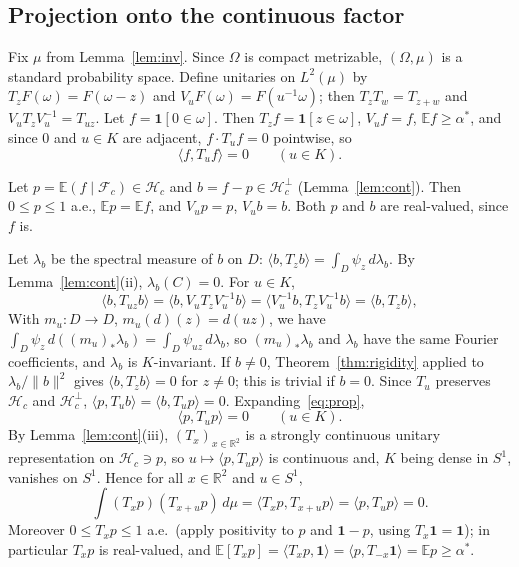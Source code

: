 \documentclass[11pt]{amsart}
\theoremstyle{definition}
\theoremstyle{remark}
\newcommand{\R}{\mathbb{R}}
\newcommand{\E}{\mathbb{E}}
\newcommand{\Hc}{\mathcal{H}_c}
\newcommand{\Fc}{\mathcal{F}_c}
\newcommand{\one}{\mathbf 1}
\begin{document}
\subsection{Projection onto the continuous factor}
Fix $\mu$ from Lemma~\ref{lem:inv}. Since $\Omega$ is compact metrizable, $(\Omega,\mu)$ is a standard probability space. Define unitaries on $L^2(\mu)$ by $T_zF(\omega)=F(\omega-z)$ and $V_uF(\omega)=F(u^{-1}\omega)$; then $T_zT_w=T_{z+w}$ and $V_uT_zV_u^{-1}=T_{uz}$. Let $f=\one[0\in\omega]$. Then $T_zf=\one[z\in\omega]$, $V_uf=f$, $\E f\ge\alpha^*$, and since $0$ and $u\in K$ are adjacent, $f\cdot T_uf=0$ pointwise, so
\begin{equation}\label{eq:prop}
  \langle f,T_uf\rangle=0\qquad(u\in K).
\end{equation}

Let $p=\E(f\mid\Fc)\in\Hc$ and $b=f-p\in\Hc^\perp$ (Lemma~\ref{lem:cont}). Then $0\le p\le1$ a.e., $\E p=\E f$, and $V_up=p$, $V_ub=b$. Both $p$ and $b$ are real-valued, since $f$ is.

Let $\lambda_b$ be the spectral measure of $b$ on $D$: $\langle b,T_zb\rangle=\int_D\psi_z\,d\lambda_b$. By Lemma~\ref{lem:cont}(ii), $\lambda_b(C)=0$. For $u\in K$,
\[
  \langle b,T_{uz}b\rangle=\langle b,V_uT_zV_u^{-1}b\rangle=\langle V_u^{-1}b,T_zV_u^{-1}b\rangle=\langle b,T_zb\rangle,
\]
With $m_u:D\to D$, $m_u(d)(z)=d(uz)$, we have $\int_D\psi_z\,d((m_u)_*\lambda_b)=\int_D\psi_{uz}\,d\lambda_b$, so $(m_u)_*\lambda_b$ and $\lambda_b$ have the same Fourier coefficients, and $\lambda_b$ is $K$-invariant. If $b\ne0$, Theorem~\ref{thm:rigidity} applied to $\lambda_b/\|b\|^2$ gives $\langle b,T_zb\rangle=0$ for $z\ne0$; this is trivial if $b=0$. Since $T_u$ preserves $\Hc$ and $\Hc^\perp$, $\langle p,T_ub\rangle=\langle b,T_up\rangle=0$. Expanding~\eqref{eq:prop},
\[
  \langle p,T_up\rangle=0\qquad(u\in K).
\]
By Lemma~\ref{lem:cont}(iii), $(T_x)_{x\in\R^2}$ is a strongly continuous unitary representation on $\Hc\ni p$, so $u\mapsto\langle p,T_up\rangle$ is continuous and, $K$ being dense in $S^1$, vanishes on $S^1$. Hence for all $x\in\R^2$ and $u\in S^1$,
\begin{equation}\label{eq:corr}
  \int(T_xp)(T_{x+u}p)\,d\mu=\langle T_xp,T_{x+u}p\rangle=\langle p,T_up\rangle=0 .
\end{equation}
Moreover $0\le T_xp\le1$ a.e.\ (apply positivity to $p$ and $\one-p$, using $T_x\one=\one$); in particular $T_xp$ is real-valued, and $\E[T_xp]=\langle T_xp,\one\rangle=\langle p,T_{-x}\one\rangle=\E p\ge\alpha^*$.
\end{document}
